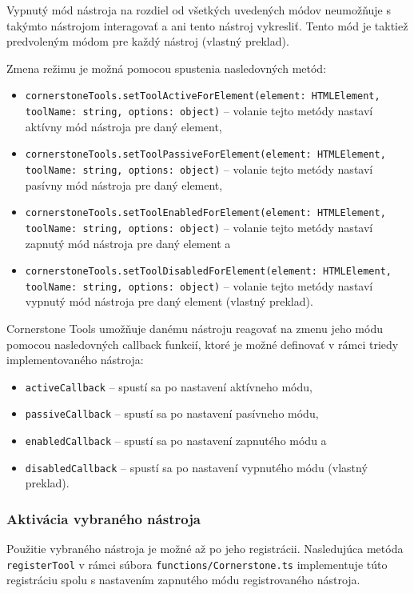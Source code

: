 Vypnutý mód nástroja na rozdiel od všetkých uvedených módov neumožňuje s takýmto nástrojom interagovať a ani tento nástroj vykresliť. Tento mód je taktiež predvoleným módom pre každý nástroj \cite{cornerstone_tools_modes} (vlastný preklad).

Zmena režimu je možná pomocou spustenia nasledovných metód:
\begin {itemize}
\item {\texttt{cornerstoneTools.setToolActiveForElement(element: HTMLElement, toolName: string, options: object)} -- volanie tejto metódy nastaví aktívny mód nástroja pre daný element,}
\item {\texttt{cornerstoneTools.setToolPassiveForElement(element: HTMLElement, toolName: string, options: object)} -- volanie tejto metódy nastaví pasívny mód nástroja pre daný element,}
\item {\texttt{cornerstoneTools.setToolEnabledForElement(element: HTMLElement, toolName: string, options: object)} -- volanie tejto metódy nastaví zapnutý mód nástroja pre daný element a}
\item {\texttt{cornerstoneTools.setToolDisabledForElement(element: HTMLElement, toolName: string, options: object)} -- volanie tejto metódy nastaví vypnutý mód nástroja pre daný element  \cite{cornerstone_tools_modes} (vlastný preklad).}
\end {itemize}

Cornerstone Tools umožňuje danému nástroju reagovať na zmenu jeho módu pomocou nasledovných callback funkcií, ktoré je možné definovať v rámci triedy implementovaného nástroja:
\begin {itemize}
\item {\texttt{activeCallback} -- spustí sa po nastavení aktívneho módu,}
\item {\texttt{passiveCallback} -- spustí sa po nastavení pasívneho módu,}
\item {\texttt{enabledCallback} -- spustí sa po nastavení zapnutého módu a}
\item {\texttt{disabledCallback} -- spustí sa po nastavení vypnutého módu  \cite{cornerstone_tools_modes} (vlastný preklad).}
\end {itemize}

\subsubsection {Aktivácia vybraného nástroja}
Použitie vybraného nástroja je možné až po jeho registrácii.
Nasledujúca metóda \texttt{registerTool} v rámci súbora \texttt{functions/Cornerstone.ts} implementuje  túto registráciu spolu s nastavením zapnutého módu registrovaného nástroja.

